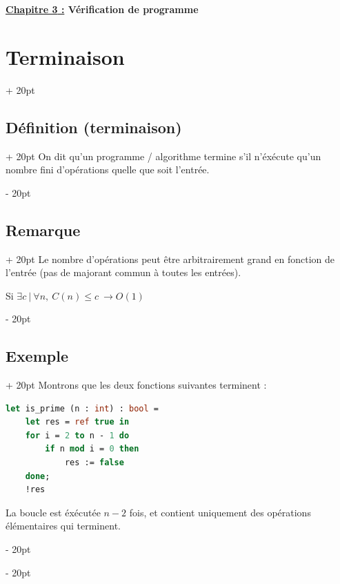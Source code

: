 \documentclass[a4paper, 12pt, twoside]{article}
\renewcommand{\emph}{\textcolor{ff4500}}
\renewcommand{\le}{\leqslant}
\newcommand{\ind}[1][20pt]{\advance\leftskip + #1}
\newcommand{\deind}[1][20pt]{\advance\leftskip - #1}
\newenvironment{indentedenv}[1][20pt]{\par \ind[#1]}{\par \deind}
\newenvironment{indt}[2][20pt]{#2 \begin{indentedenv}[#1]}{\end{indentedenv}} %
\newcommand{\thetitle}[2]{\begin{center}\textbf{{\LARGE \underline{\emph{#1} :}} {\Large #2}}\end{center}}
\begin{document}
    \thetitle{Chapitre 3}{Vérification de programme}
    
    \tableofcontents
    
    \newpage
    
    
    \begin{indt}{\section{Terminaison}}
        
        \begin{indt}{\subsection{Définition (terminaison)}}
            On dit qu'un programme / algorithme termine s'il n'éxécute qu'un nombre fini d'opérations quelle que soit l'entrée.
        \end{indt}
        
        \begin{indt}{\subsection{Remarque}}
            Le nombre d'opérations peut être arbitrairement grand en fonction de l'entrée (pas de majorant commun à toutes les entrées).
            
            Si $\exists c \ |\ \forall n,\ C(n) \le c \ \longrightarrow O(1)$
        \end{indt}
        
        \begin{indt}{\subsection{Exemple}}
            Montrons que les deux fonctions suivantes terminent :
            
            \begin{lstlisting}[language=Caml, xleftmargin=60pt]
let is_prime (n : int) : bool =
    let res = ref true in
    for i = 2 to n - 1 do
        if n mod i = 0 then
            res := false
    done;
    !res\end{lstlisting}
            
            \vspace{6pt}
            
            La boucle est éxécutée $n - 2$ fois, et contient uniquement des opérations élémentaires qui terminent.
            

\end{indt}
\end{indt}
\end{document}

